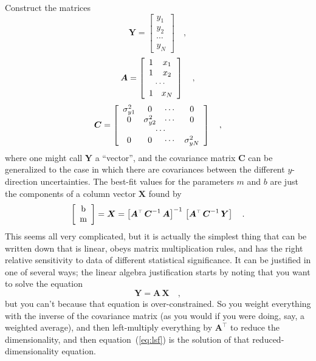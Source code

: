 \documentclass[12pt]{article}
\newcommand{\equationname}{equation}
\newcommand{\mmatrix}[1]{\boldsymbol{#1}}
\newcommand{\inverse}[1]{{#1}^{-1}}
\newcommand{\transpose}[1]{{#1}^{\scriptscriptstyle \top}}
\newcommand{\mA}{\mmatrix{A}}
\newcommand{\mAT}{\transpose{\mA}}
\newcommand{\mC}{\mmatrix{C}}
\newcommand{\mCinv}{\inverse{\mC}}
\newcommand{\mX}{\mmatrix{X}}
\newcommand{\mY}{\mmatrix{Y}}
\begin{document}
Construct the matrices
\begin{equation}\label{eq:mY}
\mY = \left[\begin{array}{c}
y_1 \\
y_2 \\
\cdots \\
y_N
\end{array}\right] \quad ,
\end{equation}
\begin{equation}
\mA = \left[\begin{array}{cc}
1 & x_1 \\
1 & x_2 \\
\multicolumn{2}{c}{\cdots} \\
1 & x_N
\end{array}\right] \quad ,
\end{equation}
\begin{equation}
\mC = \left[\begin{array}{cccc}
\sigma_{y1}^{2} & 0 & \cdots & 0 \\
0 & \sigma_{y2}^{2} & \cdots & 0 \\
\multicolumn{4}{c}{\cdots} \\
0 & 0 & \cdots & \sigma_{yN}^{2}
\end{array}\right] \quad ,
\end{equation}
where one might call $\mY$ a ``vector'', and the covariance matrix
$\mC$ can be generalized to the case in which there are covariances
between the different $y$-direction uncertainties.  The best-fit
values for the parameters $m$ and $b$ are just the components of a
column vector $\mX$ found by
\begin{equation}\label{eq:lsf}
\left[\begin{array}{c} $b$ \\ $m$ \end{array}\right]
 = \mX = \inverse{\left[\mAT\,\mCinv\,\mA\right]}
  \,\left[\mAT\,\mCinv\,\mY\right] \quad .
\end{equation}
This seems all very complicated, but it is actually the simplest thing
that can be written down that is linear, obeys matrix multiplication
rules, and has the right relative sensitivity to data of different
statistical significance.  It can be justified in one of several ways;
the linear algebra justification starts by noting that you want to
solve the equation
\begin{equation}
\mY = \mA\,\mX \quad ,
\end{equation}
but you can't because that equation is over-constrained.  So you
weight everything with the inverse of the covariance matrix (as you
would if you were doing, say, a weighted average), and then
left-multiply everything by $\mAT$ to reduce the dimensionality, and
then \equationname~(\ref{eq:lsf}) is the solution of that
reduced-dimensionality equation.
\end{document}
